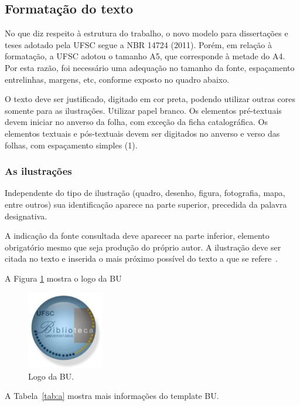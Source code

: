 \documentclass{ufscThesis} %
\begin{document}
\subsection{Formatação do texto}

No que diz respeito à estrutura do trabalho, o novo modelo para dissertações e teses adotado pela UFSC segue a NBR 14724 (2011). Porém, em relação à formatação, a UFSC adotou o tamanho A5, que corresponde à metade do A4. Por esta razão, foi necessário uma adequação no tamanho da fonte, espaçamento entrelinhas, margens, etc, conforme exposto no quadro abaixo.

O texto deve ser justificado, digitado em cor preta, podendo utilizar outras cores somente para as ilustrações. Utilizar papel branco. Os elementos pré-textuais devem iniciar no anverso da folha, com  exceção da ficha catalográfica. Os elementos textuais e pós-textuais devem ser digitados no anverso e verso das folhas, com espaçamento simples (1). 



\subsubsection{As ilustrações}

Independente do tipo de ilustração (quadro, desenho, figura, fotografia, mapa, entre outros) sua identificação aparece na parte superior, precedida da palavra designativa. 



A indicação da fonte consultada deve aparecer na parte inferior, elemento obrigatório mesmo que seja produção do próprio autor. A ilustração deve ser citada no texto e inserida o mais próximo possível do texto a que se refere~\cite{abnt14724}. 

A Figura \ref{fig:a} mostra o logo da BU
\begin{figure}[!htb]
   \centering
   \caption{Logo da BU.}\label{fig:a}
   \includegraphics[width=0.3\textwidth]{figuras/brasaoBU.jpg}
\end{figure}

A Tabela~\ref{tab:a} mostra mais informações do template BU.
\end{document}
